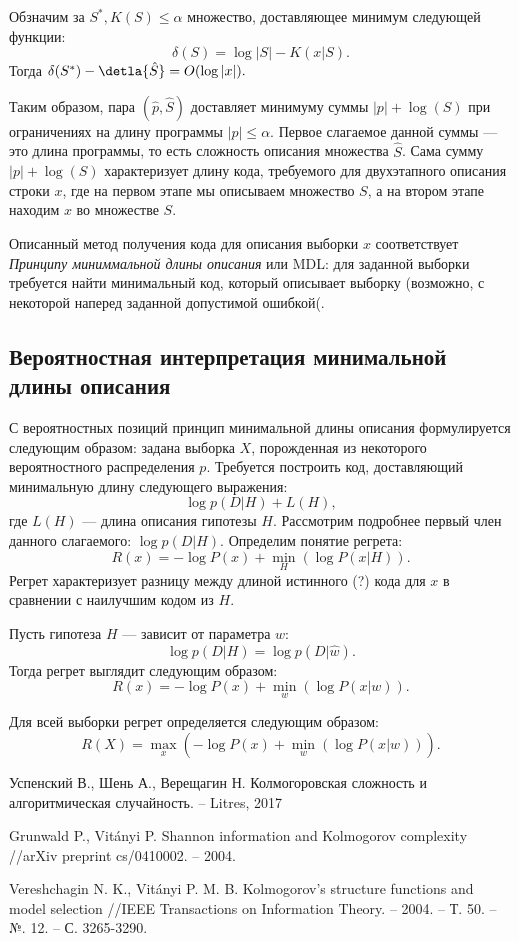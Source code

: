 \documentclass[../main.tex]{subfiles}
\begin{document}
\begin{theorembd}
Обзначим за $S^{*}, K(S) \leq \alpha$  множество, доставляющее минимум следующей функции:
\[
    \delta(S) = \log |S| - K(x|S).
\]
Тогда  $\delta(S^{*}) - \detla{\hat{S}} = O(\log |x|).$
\end{theorembd}

Таким образом, пара $(\hat{p}, \hat{S})$ доставляет минимуму суммы $|p| + \log(S)$ при ограничениях на длину программы $|p| \leq \alpha$. Первое слагаемое данной суммы --- это длина  программы, то есть сложность описания множества $\hat{S}$. Сама сумму $|p| + \log(S)$ характеризует длину кода, требуемого для двухэтапного описания строки $x$, где на первом этапе мы описываем множество $S$, а на втором этапе находим $x$ во множестве $S$.

Описанный метод получения кода для описания выборки $x$ соответствует \textit{Принципу миниммальной длины описания} или MDL: для заданной выборки требуется найти минимальный код, который описывает выборку (возможно, с некоторой наперед заданной допустимой ошибкой(.

\subsection{Вероятностная интерпретация минимальной длины описания}
С вероятностных позиций принцип минимальной длины описания формулируется следующим образом: задана выборка $X$, порожденная из некоторого вероятностного распределения $p$. Требуется построить код, доставляющий минимальную длину следующего выражения:
\[
    \log p(D|H) + L(H), 
\]
где $L(H)$ --- длина описания гипотезы $H$. 
Рассмотрим подробнее первый член данного слагаемого: $\log p(D|H)$. 
Определим понятие регрета:
\[
R(x) =  - \log P(x) + \min_{H} (\log P(x|H)).
\]
Регрет характеризует разницу между длиной истинного (?) кода для $x$ в сравнении с наилучшим кодом из $H$.

Пусть гипотеза $H$ --- зависит от параметра $w$:
\[
    \log p(D|H) = \log p(D|\hat{w}).    
\]
Тогда регрет выглядит следующим образом:
\[
R(x) =  - \log P(x) + \min_{w} (\log P(x|w)).
\]

Для всей выборки регрет определяется следующим образом:
\[
R(X) =  \max_{x} (- \log P(x) + \min_{w} (\log P(x|w))).
\]



\begin{thebibliography}{99}
	Успенский В., Шень А., Верещагин Н. Колмогоровская сложность и алгоритмическая случайность. – Litres, 2017

Grunwald P., Vitányi P. Shannon information and Kolmogorov complexity //arXiv preprint cs/0410002. – 2004.

Vereshchagin N. K., Vitányi P. M. B. Kolmogorov's structure functions and model selection //IEEE Transactions on Information Theory. – 2004. – Т. 50. – №. 12. – С. 3265-3290.
\end{thebibliography}
\end{document}
